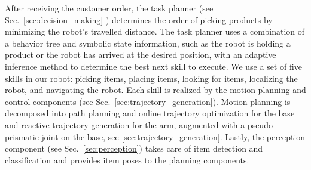 After receiving the customer order, the task planner (see Sec.~\ref{sec:decision_making}
) determines the order of picking products by minimizing the robot's travelled distance. 
The task planner uses a combination of a behavior tree and symbolic state information, such as the robot is holding a product or the robot has arrived at the desired position, with an adaptive inference method to determine the best next skill to execute. 
We use a set of five skills in our robot: picking items, placing items, looking for items, localizing the robot, and navigating the robot. 
Each skill is realized by the motion planning and control components (see Sec.~\ref{sec:trajectory_generation}). 
Motion planning is decomposed into path planning and online trajectory optimization for the base and reactive trajectory generation for the arm, augmented with a pseudo-prismatic joint on the base, see \cref{sec:trajectory_generation}.
Lastly, the perception component (see Sec.~\ref{sec:perception}) takes care of item detection and classification and provides item poses to the planning components.












